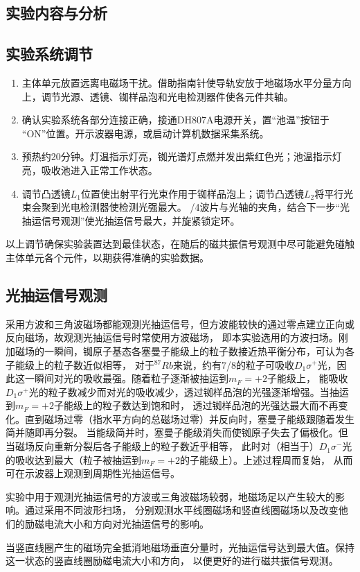 \documentclass[11pt,a4paper]{article}
\begin{document}
\begin{spacing}{1.3}
\begin{CJK*}{UTF8}{gbsn}
\section{实验内容与分析}
\subsection{实验系统调节}
\begin{enumerate}
\item 主体单元放置远离电磁场干扰。借助指南针使导轨安放于地磁场水平分量方向上，调节光源、透镜、铷样品泡和光电检测器件使各元件共轴。
\item 确认实验系统各部分连接正确，接通DH807A电源开关，置“池温”按钮于 “ON”位置。开示波器电源，或启动计算机数据采集系统。
\item 预热约20分钟。灯温指示灯亮，铷光谱灯点燃并发出紫红色光；池温指示灯亮，吸收池进入正常工作状态。
\item 调节凸透镜$L_1$位置使出射平行光束作用于铷样品泡上；调节凸透镜$L_2$将平行光束会聚到光电检测器使检测光强最大。
/4波片与光轴的夹角，结合下一步“光抽运信号观测”使光抽运信号最大，并旋紧锁定环。
\end{enumerate}
以上调节确保实验装置达到最佳状态，在随后的磁共振信号观测中尽可能避免碰触主体单元各个元件，以期获得准确的实验数据。\par

\subsection{光抽运信号观测}
采用方波和三角波磁场都能观测光抽运信号，但方波能较快的通过零点建立正向或反向磁场，故观测光抽运信号时常使用方波磁场，
即本实验选用的方波扫场。刚加磁场的一瞬间，铷原子基态各塞曼子能级上的粒子数接近热平衡分布，可认为各子能级上的粒子数近似相等，
对于$^{87}Rb$来说，约有7/8的粒子可吸收$D_1\sigma^+$光，因此这一瞬间对光的吸收最强。随着粒子逐渐被抽运到$m_F=+2$子能级上，
能吸收$D_1\sigma^+$光的粒子数减少而对光的吸收减少，透过铷样品泡的光强逐渐增强。当抽运到$m_F=+2$子能级上的粒子数达到饱和时，
透过铷样品泡的光强达最大而不再变化。直到磁场过零（指水平方向的总磁场过零）并反向时，塞曼子能级跟随着发生简并随即再分裂。
当能级简并时，塞曼子能级消失而使铷原子失去了偏极化。但当磁场反向重新分裂后各子能级上的粒子数近乎相等，
此时对（相当于）$D_1\sigma^-$光的吸收达到最大（粒子被抽运到$m_F=+2$的子能级上）。上述过程周而复始，
从而可在示波器上观测到周期性光抽运信号。\par
实验中用于观测光抽运信号的方波或三角波磁场较弱，地磁场足以产生较大的影响。通过采用不同波形扫场，
分别观测水平线圈磁场和竖直线圈磁场以及改变他们的励磁电流大小和方向对光抽运信号的影响。\par
当竖直线圈产生的磁场完全抵消地磁场垂直分量时，光抽运信号达到最大值。保持这一状态的竖直线圈励磁电流大小和方向，
以便更好的进行磁共振信号观测。


\end{CJK*}
\end{spacing}
\end{document}
